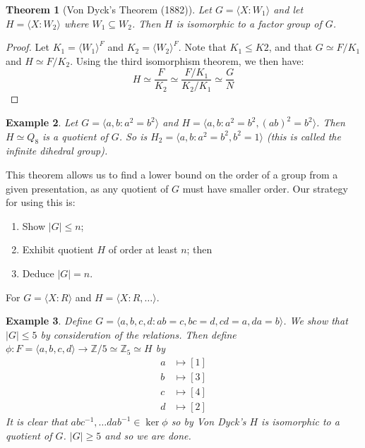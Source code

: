 \documentclass[a4paper,10pt]{article}
\newcommand{\ZZ}{\mathbb{Z}}
\newtheorem{thm}{Theorem}
\newtheorem{eg}[thm]{Example}
\begin{document}
\begin{thm}[Von Dyck's Theorem (1882)]
Let $G = \langle X : W_1 \rangle$ and let $H = \langle X : W_2 \rangle$ where $W_1 \subseteq W_2$. Then $H$ is isomorphic to a factor group of $G$. 
\end{thm}

\begin{proof}
Let $K_1 = \langle W_1 \rangle^F$ and $K_2 = \langle W_2 \rangle^F$. Note that $K_1 \leq K2$, and that $G \simeq F / K_1$ and $H \simeq F / K_2$. Using the third isomorphism theorem, we then have:
\[ H \simeq \frac{F}{K_2} \simeq \frac{F / K_1}{K_2 / K_1} \simeq \frac{G}{N} \]
\end{proof}

\begin{eg}
Let $G = \langle a,b : a^2 = b^2 \rangle$ and $H = \langle a,b : a^2 = b^2, (ab)^2 = b^2 \rangle$. Then $H \simeq Q_8$ is a quotient of $G$. So is $H_2 = \langle a,b : a^2 = b^2, b^2 = 1 \rangle$ (this is called the infinite dihedral group). 
\end{eg}
This theorem allows us to find a lower bound on the order of a group from a given presentation, as any quotient of $G$ must have smaller order. Our strategy for using this is:
\begin{enumerate}
\item Show $|G| \leq n$;
\item Exhibit quotient $H$ of order at least $n$; then
\item Deduce $|G| = n$.
\end{enumerate}
For $G = \langle X : R \rangle$ and $H = \langle X : R, \dots \rangle$. 


\begin{eg}
Define $G = \langle a,b,c,d : ab = c, bc = d, cd = a, da = b \rangle$. We show that $|G| \leq 5$ by consideration of the relations. Then define $\phi : F = \langle a,b,c,d\rangle \rightarrow \ZZ / 5 \simeq \ZZ_5 \simeq H$ by 
\begin{align*}
a &\mapsto [1] \\
b &\mapsto [3] \\
c &\mapsto [4] \\
d &\mapsto [2]
\end{align*}
It is clear that $abc^{-1}, \dots dab^{-1} \in \ker\phi$ so by Von Dyck's $H$ is isomorphic to a quotient of $G$. $|G| \geq 5$ and so we are done. 
\end{eg}
\end{document}
